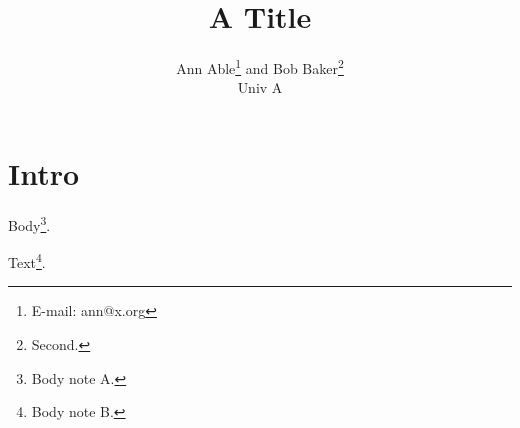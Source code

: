\documentclass{mnras}
\title{A Title}
\author[A. Able]{Ann Able\thanks{E-mail: ann@x.org} and Bob Baker\thanks{Second.}\\ Univ A}
\begin{document}
\section{Intro}
Body\footnote{Body note A.}.
\maketitle
Text\footnote{Body note B.}.
\end{document}
